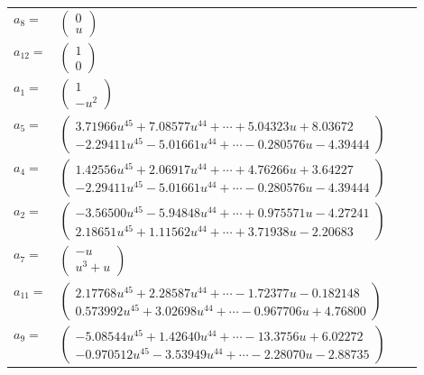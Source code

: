 \documentclass[1p]{elsarticle_modified}
\theoremstyle{definition}
\begin{document}
\begin{tabular}{m{7pt} m{180pt} m{7pt} m{180pt} }
\flushright $a_{8}=$&$\begin{pmatrix}0\\u\end{pmatrix}$ \\
\flushright $a_{12}=$&$\begin{pmatrix}1\\0\end{pmatrix}$ \\
\flushright $a_{1}=$&$\begin{pmatrix}1\\- u^2\end{pmatrix}$ \\
\flushright $a_{5}=$&$\begin{pmatrix}3.71966 u^{45}+7.08577 u^{44}+\cdots+5.04323 u+8.03672\\-2.29411 u^{45}-5.01661 u^{44}+\cdots-0.280576 u-4.39444\end{pmatrix}$ \\
\flushright $a_{4}=$&$\begin{pmatrix}1.42556 u^{45}+2.06917 u^{44}+\cdots+4.76266 u+3.64227\\-2.29411 u^{45}-5.01661 u^{44}+\cdots-0.280576 u-4.39444\end{pmatrix}$ \\
\flushright $a_{2}=$&$\begin{pmatrix}-3.56500 u^{45}-5.94848 u^{44}+\cdots+0.975571 u-4.27241\\2.18651 u^{45}+1.11562 u^{44}+\cdots+3.71938 u-2.20683\end{pmatrix}$ \\
\flushright $a_{7}=$&$\begin{pmatrix}- u\\u^3+u\end{pmatrix}$ \\
\flushright $a_{11}=$&$\begin{pmatrix}2.17768 u^{45}+2.28587 u^{44}+\cdots-1.72377 u-0.182148\\0.573992 u^{45}+3.02698 u^{44}+\cdots-0.967706 u+4.76800\end{pmatrix}$ \\
\flushright $a_{9}=$&$\begin{pmatrix}-5.08544 u^{45}+1.42640 u^{44}+\cdots-13.3756 u+6.02272\\-0.970512 u^{45}-3.53949 u^{44}+\cdots-2.28070 u-2.88735\end{pmatrix}$ \\

\end{tabular}
\end{document}

